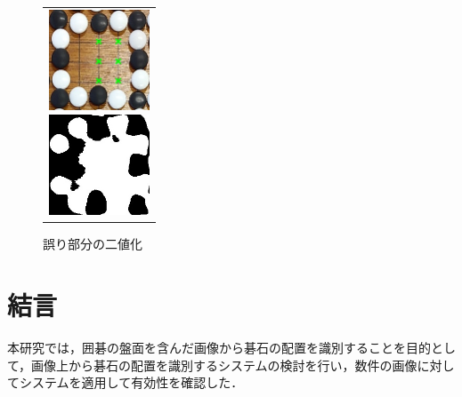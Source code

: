 \documentclass[summary]{nitocs}
\numberwithin{equation}{section}
\begin{document}
            \begin{figure}[tb] %
                \begin{center}
                  \begin{tabular}{c}
                    \begin{minipage}{0.5\hsize}
                      \begin{center}
                        \includegraphics[clip,width=30mm]{DSC_0098/TRIM_resultCompare.jpg}
                    \caption{誤り部分の一部}
                    \label{ex3_error}
                      \end{center}
                    \end{minipage}
                    \begin{minipage}{0.5\hsize}
                      \begin{center}
                        \includegraphics[clip,width=30mm]{DSC_0098/TRIM_inRange_WHITE.jpg}
                    \caption{誤り部分の二値化}
                    \label{ex3_error_area}
                      \end{center}
                    \end{minipage}
                  \end{tabular}
                \end{center}
            \end{figure}




    \section{結言}\label{conclusion} %
        本研究では，囲碁の盤面を含んだ画像から碁石の配置を識別することを目的として，画像上から碁石の配置を識別するシステムの検討を行い，数件の画像に対してシステムを適用して有効性を確認した．
\end{document}
